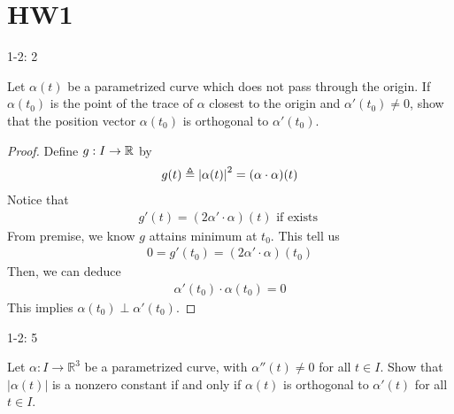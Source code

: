 \documentclass{report}
\begin{document}
\section{HW1}
\begin{question}{1-2: 2}{}

Let \(\alpha(t)\) be a parametrized curve which does not pass through the origin. If \(\alpha(t_0)\) is the point of the trace of \(\alpha\) closest to the origin and \(\alpha'(t_0) \neq 0\), show that the position vector \(\alpha(t_0)\) is orthogonal to \(\alpha'(t_0)\).
\end{question}
\begin{proof}
Define $g:I\rightarrow \mathbb{R}$ by 
\begin{align*}
g(t)\triangleq \left|\alpha (t)\right|^2=(\alpha \cdot \alpha )(t)
\end{align*}
Notice that 
\begin{align*}
g'(t)=(2\alpha '\cdot \alpha )(t)\text{ if exists }
\end{align*}
From premise, we know $g$ attains minimum at $t_0$. This tell us 
\begin{align*}
0=g'(t_0)=(2\alpha '\cdot \alpha )(t_0)
\end{align*}
Then, we can deduce 
\begin{align*}
\alpha '(t_0)\cdot \alpha (t_0)=0
\end{align*}
This implies $\alpha (t_0)\perp \alpha '(t_0)$. 
\end{proof}
\begin{question}{1-2: 5}{}

Let \(\alpha : I \rightarrow \mathbb{R}^3\) be a parametrized curve, with \(\alpha''(t) \neq 0\) for all \(t \in I\). Show that \(|\alpha(t)|\) is a nonzero constant if and only if \(\alpha(t)\) is orthogonal to \(\alpha'(t)\) for all \(t \in I\).
\end{question}
\end{document}
